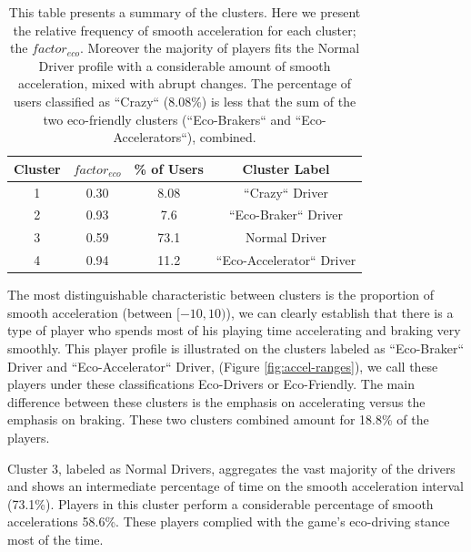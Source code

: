 \documentclass[preprint,authoryear,12pt]{elsarticle}
\begin{document}
\begin{table}[!h]
	\renewcommand*{\arraystretch}{1.4}
	\caption{This table presents a summary of the clusters. Here we present the relative frequency of smooth acceleration for each cluster; the $factor_{eco}$. Moreover the majority of players fits the Normal Driver profile with a considerable amount of smooth acceleration, mixed with abrupt changes. The percentage of users classified as ``Crazy`` (8.08\%) is less that the sum of the two eco-friendly clusters (``Eco-Brakers`` and ``Eco-Accelerators``), combined. }
	\begin{center}
		\begin{tabular}{c|c|c|c}
			Cluster & $factor_{eco}$ & \% of Users & Cluster Label \\
			\hline
			1 &	 0.30
			& 8.08  & ``Crazy`` Driver  \\
			
			2 & 0.93
			& 7.6  &  ``Eco-Braker`` Driver \\
			
			3 &	 0.59
			& 73.1  &  Normal Driver  \\
			
			4 & 0.94
			& 11.2  &  ``Eco-Accelerator`` Driver \\
		\end{tabular}
	\end{center}
	\label{T:factors}
\end{table}



The most distinguishable characteristic between clusters is the proportion of smooth acceleration (between $[-10, 10)$), we can clearly establish that there is a type of player who spends most of his playing time accelerating and braking very smoothly. This player profile is illustrated on the clusters labeled as ``Eco-Braker`` Driver and  ``Eco-Accelerator`` Driver, (Figure \ref{fig:accel-ranges}), we call these players under these classifications Eco-Drivers or Eco-Friendly. The main difference between these clusters is the emphasis on accelerating versus the emphasis on braking. These two clusters combined amount for 18.8\% of the players.



Cluster 3, labeled as Normal Drivers, aggregates the vast majority of the drivers and shows an intermediate percentage of time on the smooth acceleration interval (73.1\%). Players in this cluster perform a considerable percentage of smooth accelerations 58.6\%. These players complied with the game's eco-driving stance most of the time.
\end{document}

